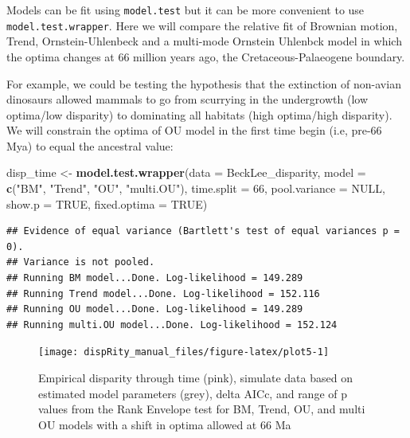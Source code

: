 \documentclass[
]{book}
\newenvironment{Shaded}{\begin{snugshade}}{\end{snugshade}}
\newcommand{\DataTypeTok}[1]{\textcolor[rgb]{0.13,0.29,0.53}{#1}}
\newcommand{\DecValTok}[1]{\textcolor[rgb]{0.00,0.00,0.81}{#1}}
\newcommand{\KeywordTok}[1]{\textcolor[rgb]{0.13,0.29,0.53}{\textbf{#1}}}
\newcommand{\NormalTok}[1]{#1}
\newcommand{\OtherTok}[1]{\textcolor[rgb]{0.56,0.35,0.01}{#1}}
\newcommand{\StringTok}[1]{\textcolor[rgb]{0.31,0.60,0.02}{#1}}
\begin{document}
Models can be fit using \texttt{model.test} but it can be more convenient to use \texttt{model.test.wrapper}.
Here we will compare the relative fit of Brownian motion, Trend, Ornstein-Uhlenbeck and a multi-mode Ornstein Uhlenbck model in which the optima changes at 66 million years ago, the Cretaceous-Palaeogene boundary.

For example, we could be testing the hypothesis that the extinction of non-avian dinosaurs allowed mammals to go from scurrying in the undergrowth (low optima/low disparity) to dominating all habitats (high optima/high disparity).
We will constrain the optima of OU model in the first time begin (i.e, pre-66 Mya) to equal the ancestral value:

\begin{Shaded}
\begin{Highlighting}[]
\NormalTok{disp\_time \textless{}{-}}\StringTok{ }\KeywordTok{model.test.wrapper}\NormalTok{(}\DataTypeTok{data =}\NormalTok{ BeckLee\_disparity,}
                        \DataTypeTok{model =} \KeywordTok{c}\NormalTok{(}\StringTok{"BM"}\NormalTok{, }\StringTok{"Trend"}\NormalTok{, }\StringTok{"OU"}\NormalTok{, }\StringTok{"multi.OU"}\NormalTok{),}
                                \DataTypeTok{time.split =} \DecValTok{66}\NormalTok{,}
                                \DataTypeTok{pool.variance =} \OtherTok{NULL}\NormalTok{,}
                                \DataTypeTok{show.p =} \OtherTok{TRUE}\NormalTok{,}
                                \DataTypeTok{fixed.optima =} \OtherTok{TRUE}\NormalTok{)}
\end{Highlighting}
\end{Shaded}

\begin{verbatim}
## Evidence of equal variance (Bartlett's test of equal variances p = 0).
## Variance is not pooled.
## Running BM model...Done. Log-likelihood = 149.289
## Running Trend model...Done. Log-likelihood = 152.116
## Running OU model...Done. Log-likelihood = 149.289
## Running multi.OU model...Done. Log-likelihood = 152.124
\end{verbatim}

\begin{figure}

{\centering \texttt{[image: dispRity\_manual\_files/figure-latex/plot5-1]} 

}

\caption{Empirical disparity through time (pink), simulate data based on estimated model parameters (grey), delta AICc, and range of p values from the Rank Envelope test for BM, Trend, OU, and multi OU models with a shift in optima allowed at 66 Ma}\label{fig:plot5}
\end{figure}
\end{document}
